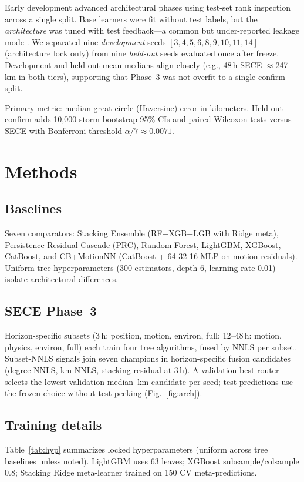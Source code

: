 \documentclass[11pt]{article}
\newcommand{\sece}{SECE}
\newcommand{\km}{\,km}
\newcommand{\bonf}{0.0071}
\begin{document}
Early development advanced architectural phases using test-set rank inspection across a single split.
Base learners were fit without test labels, but the \emph{architecture} was tuned with test feedback---a common but under-reported leakage mode \cite{cawley2010}.
We separated nine \emph{development} seeds $[3,4,5,6,8,9,10,11,14]$ (architecture lock only) from nine \emph{held-out} seeds evaluated once after freeze.
Development and held-out mean medians align closely (e.g., 48\,h \sece{} $\approx$247\,\km{} in both tiers), supporting that Phase~3 was not overfit to a single confirm split.

Primary metric: median great-circle (Haversine) error in kilometers.
Held-out confirm adds 10{,}000 storm-bootstrap 95\% CIs and paired Wilcoxon tests versus \sece{} with Bonferroni threshold $\alpha/7 \approx \bonf$.

\section{Methods}
\label{sec:methods}

\subsection{Baselines}
Seven comparators: Stacking Ensemble (RF+XGB+LGB with Ridge meta), Persistence Residual Cascade (PRC), Random Forest, LightGBM, XGBoost, CatBoost, and CB+MotionNN (CatBoost + 64-32-16 MLP on motion residuals).
Uniform tree hyperparameters (300 estimators, depth 6, learning rate 0.01) isolate architectural differences.

\subsection{\sece{} Phase~3}
Horizon-specific subsets (3\,h: position, motion, environ, full; 12--48\,h: motion, physics, environ, full) each train four tree algorithms, fused by NNLS per subset.
Subset-NNLS signals join seven champions in horizon-specific fusion candidates (degree-NNLS, km-NNLS, stacking-residual at 3\,h).
A validation-best router selects the lowest validation median-\km{} candidate per seed; test predictions use the frozen choice without test peeking (Fig.~\ref{fig:arch}).

\subsection{Training details}
Table~\ref{tab:hyp} summarizes locked hyperparameters (uniform across tree baselines unless noted).
LightGBM uses 63 leaves; XGBoost subsample/colsample 0.8; Stacking Ridge meta-learner trained on 150 CV meta-predictions.
\end{document}
